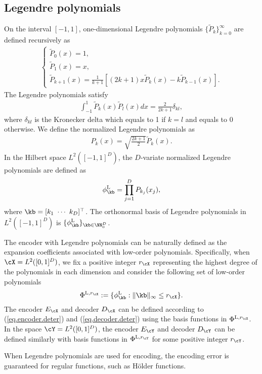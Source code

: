 \documentclass[11pt]{article} %
\begin{document}
\subsection{ Legendre polynomials} On the interval $[-1,1]$, one-dimensional Legendre polynomials $\{\widetilde{P}_k\}_{k=0}^{\infty}$ are defined recursively as
\begin{align*}
	\begin{cases}
		\widetilde{P}_0(x)=1,\\
		\widetilde{P}_1(x)=x,\\
		\widetilde{P}_{k+1}(x)=\frac{1}{k+1}\left[(2k+1)x\widetilde{P}_{k}(x)-k\widetilde{P}_{k-1}(x)\right].
	\end{cases}
\end{align*}
The Legendre polynomials satisfy
\begin{align*}
	\int_{-1}^1 \widetilde{P}_k(x)\widetilde{P}_l(x)dx=\frac{2}{2k+1}\delta_{kl},
\end{align*}
where $\delta_{kl}$ is the Kronecker delta which equals to 1 if $k=l$ and equals to 0 otherwise. We define the normalized Legendre polynomials as 
\begin{align}
	P_k(x)=\sqrt{\frac{2k+1}{2}}\widetilde{P}_k(x).
\end{align}
In the Hilbert space $L^2([-1,1]^D)$, the $D$-variate normalized Legendre polynomials are defined as 
\begin{align}
	\phi^{\rm L}_{\kb}=\prod_{j=1}^{D} P_{k_j}(x_j),
\end{align}
where $\kb=[
	k_1\ \cdots \ k_D ]^{\top}$. The orthonormal basis of Legendre polynomials in $L^2([-1,1]^D)$ is $\{\phi^{\rm L}_{\kb}\}_{\kb\in\NN_0^D}$. 
	
The encoder with Legendre polynomials can be naturally defined as the expansion coefficients associated with low-order polynomials. 
Specifically, when $\cX=L^2([0,1]^D)$, we fix a positive integer $r_{\cX}$ representing the highest degree of the polynomials in each dimension and consider the following set of low-order polynomials 
$$
\Phi^{{\rm L},r_{\cX}}:=\{\phi^{\rm L}_\kb: \|\kb\|_{\infty}\leq r_{\cX}\}.
$$
The encoder $E_{\cX}$ and decoder $D_{\cX}$ can be defined according to (\ref{eq.encoder.deter}) and (\ref{eq.decoder.deter}) using the basis functions in $\Phi^{{\rm L},r_{\cX}}$. In the space $\cY=L^2([0,1]^D)$, the encoder $E_{\cY}$ and decoder $D_{\cY}$ can be defined similarly with basis functions in $\Phi^{{\rm L},r_{\cY}}$ for some positive integer $r_{\cY}$.


When Legendre polynomials are used for encoding, the encoding error is guaranteed for regular functions, such as H\"{o}lder functions.
\end{document}
